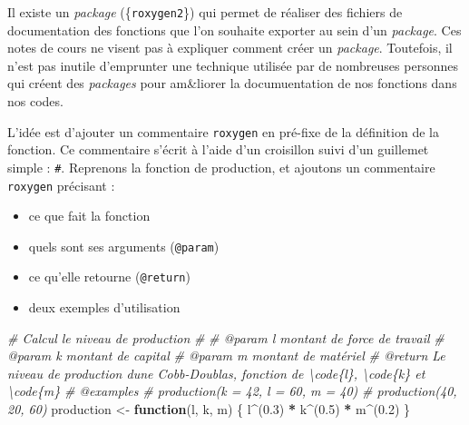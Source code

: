 \documentclass[
  11pt,
]{book}
\newenvironment{Shaded}{\begin{snugshade}}{\end{snugshade}}
\newcommand{\CommentTok}[1]{\textcolor[rgb]{0.56,0.35,0.01}{\textit{#1}}}
\newcommand{\ControlFlowTok}[1]{\textcolor[rgb]{0.13,0.29,0.53}{\textbf{#1}}}
\newcommand{\FloatTok}[1]{\textcolor[rgb]{0.00,0.00,0.81}{#1}}
\newcommand{\NormalTok}[1]{#1}
\newcommand{\OperatorTok}[1]{\textcolor[rgb]{0.81,0.36,0.00}{\textbf{#1}}}
\newcommand{\StringTok}[1]{\textcolor[rgb]{0.31,0.60,0.02}{#1}}
\providecommand{\tightlist}{%
  \setlength{\itemsep}{0pt}\setlength{\parskip}{0pt}}
\numberwithin{equation}{section}
\numberwithin{countremarque}{section}
\begin{document}
Il existe un \emph{package} (\{\texttt{roxygen2}\}) qui permet de réaliser des fichiers de documentation des fonctions que l'on souhaite exporter au sein d'un \emph{package}. Ces notes de cours ne visent pas à expliquer comment créer un \emph{package}. Toutefois, il n'est pas inutile d'emprunter une technique utilisée par de nombreuses personnes qui créent des \emph{packages} pour am\&liorer la documuentation de nos fonctions dans nos codes.

L'idée est d'ajouter un commentaire \texttt{roxygen} en pré-fixe de la définition de la fonction. Ce commentaire s'écrit à l'aide d'un croisillon suivi d'un guillemet simple : \texttt{\#\textquotesingle{}}. Reprenons la fonction de production, et ajoutons un commentaire \texttt{roxygen} précisant :

\begin{itemize}
\tightlist
\item
  ce que fait la fonction
\item
  quels sont ses arguments (\texttt{@param})
\item
  ce qu'elle retourne (\texttt{@return})
\item
  deux exemples d'utilisation
\end{itemize}

\begin{Shaded}
\begin{Highlighting}[]
\CommentTok{\#\textquotesingle{} Calcul le niveau de production}
\CommentTok{\#\textquotesingle{} }
\CommentTok{\#\textquotesingle{} @param l montant de force de travail}
\CommentTok{\#\textquotesingle{} @param k montant de capital}
\CommentTok{\#\textquotesingle{} @param m montant de matériel}
\CommentTok{\#\textquotesingle{} @return Le niveau de production d\textquotesingle{}une Cobb{-}Doublas, fonction de \textbackslash{}code\{l\}, \textbackslash{}code\{k\} et \textbackslash{}code\{m\}}
\CommentTok{\#\textquotesingle{} @examples}
\CommentTok{\#\textquotesingle{} production(k = 42, l = 60, m = 40)}
\CommentTok{\#\textquotesingle{} production(40, 20, 60)}
\NormalTok{production \textless{}{-}}\StringTok{ }\ControlFlowTok{function}\NormalTok{(l, k, m) \{}
\NormalTok{  l}\OperatorTok{\^{}}\NormalTok{(}\FloatTok{0.3}\NormalTok{) }\OperatorTok{*}\StringTok{ }\NormalTok{k}\OperatorTok{\^{}}\NormalTok{(}\FloatTok{0.5}\NormalTok{) }\OperatorTok{*}\StringTok{ }\NormalTok{m}\OperatorTok{\^{}}\NormalTok{(}\FloatTok{0.2}\NormalTok{)}
\NormalTok{\}}
\end{Highlighting}
\end{Shaded}
\end{document}
